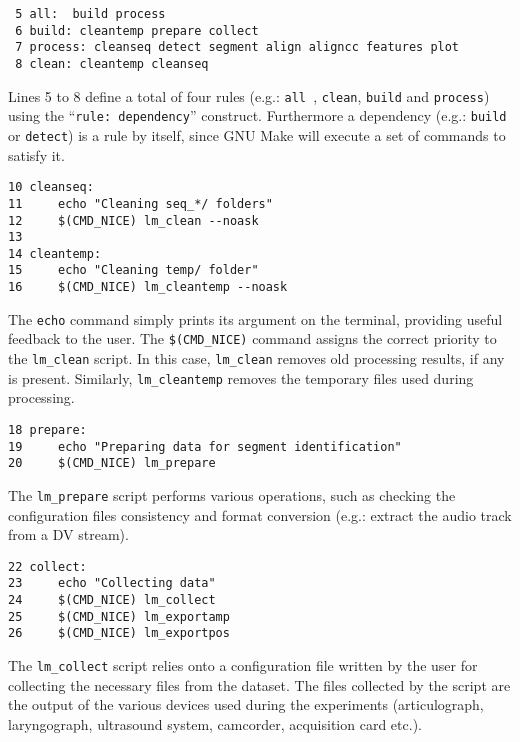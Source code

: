 \begin{scriptsize}
\begin{verbatim}
 5 all:  build process
 6 build: cleantemp prepare collect 
 7 process: cleanseq detect segment align aligncc features plot
 8 clean: cleantemp cleanseq
\end{verbatim}
\end{scriptsize}
Lines 5 to 8 define a total of four rules (e.g.: {\tt all }, {\tt clean}, 
{\tt build} and {\tt process}) using the ``{\tt rule: dependency}'' construct. 
Furthermore a dependency (e.g.: {\tt build} or {\tt detect}) is a rule by 
itself, since GNU Make will execute a set of commands to satisfy it.

\begin{scriptsize}
\begin{verbatim}
10 cleanseq:
11     echo "Cleaning seq_*/ folders"
12     $(CMD_NICE) lm_clean --noask
13
14 cleantemp:
15     echo "Cleaning temp/ folder"
16     $(CMD_NICE) lm_cleantemp --noask
\end{verbatim}
\end{scriptsize}
The {\tt echo} command simply prints its argument on the terminal, providing
useful feedback to the user. 
The  {\tt \$(CMD\_NICE)} command assigns the correct priority to the
{\tt lm\_clean} script.
In this case, {\tt lm\_clean} removes old processing results, if any is present.
Similarly, {\tt lm\_cleantemp} removes the temporary files used during
processing.

\begin{scriptsize}
\begin{verbatim}
18 prepare:	
19     echo "Preparing data for segment identification"
20     $(CMD_NICE) lm_prepare
\end{verbatim}
\end{scriptsize}
The {\tt lm\_prepare} script performs various operations, such as checking the
configuration files consistency and format conversion (e.g.: extract the audio
track from a DV stream).

\begin{scriptsize}
\begin{verbatim}
22 collect:
23     echo "Collecting data"
24     $(CMD_NICE) lm_collect
25     $(CMD_NICE) lm_exportamp
26     $(CMD_NICE) lm_exportpos
\end{verbatim}
\end{scriptsize}
The {\tt lm\_collect} script relies onto a configuration file written by the
user for collecting the necessary files from the dataset.
The files collected by the script are the output of the various devices used
during the experiments (articulograph, laryngograph, ultrasound system,
camcorder, acquisition card etc.).

